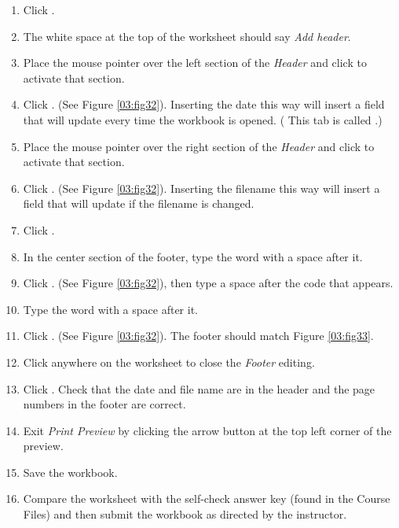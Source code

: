 \begin{enumerate}
	\item Click . 
	\item The white space at the top of the worksheet should say \textit{Add header}. 
	\item Place the mouse pointer over the left section of the \textit{Header} and click to activate that section.
	\item Click . (See Figure \ref{03:fig32}). Inserting the date this way will insert a field that will update every time the workbook is opened. ( This tab is called .)
	\item Place the mouse pointer over the right section of the \textit{Header} and click to activate that section.
	\item Click . (See Figure \ref{03:fig32}). Inserting the filename this way will insert a field that will update if the filename is changed.
	\item Click . 
	\item In the center section of the footer, type the word  with a space after it.
	\item Click . (See Figure \ref{03:fig32}), then type a space after the \fmtTyping{\&[Page]} code that appears.
	\item Type the word  with a space after it.
	\item Click . (See Figure \ref{03:fig32}). The footer should match Figure \ref{03:fig33}.
	\item Click anywhere on the worksheet to close the \textit{Footer} editing.
	\item Click . Check that the date and file name are in the header and the page numbers in the footer are correct.
	\item Exit \textit{Print Preview} by clicking the arrow button at the top left corner of the preview.
	\item Save the  workbook.
	\item Compare the worksheet with the self-check answer key (found in the Course Files) and then submit the  workbook as directed by the instructor.
\end{enumerate}

